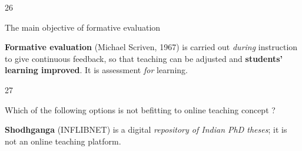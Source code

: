\begin{question}{26}
{The main objective of formative evaluation\par}
\begin{explain}
\textbf{Formative evaluation} (Michael Scriven, 1967) is carried out \emph{during} instruction to give continuous feedback, so that teaching can be adjusted and \textbf{students' learning improved}. It is assessment \emph{for} learning.
\end{explain}
\end{question}

\begin{question}{27}
{Which of the following options is not befitting to online teaching concept ?\par}
\begin{explain}
\textbf{Shodhganga} (INFLIBNET) is a digital \emph{repository of Indian PhD theses}; it is not an online teaching platform.
\end{explain}
\end{question}

